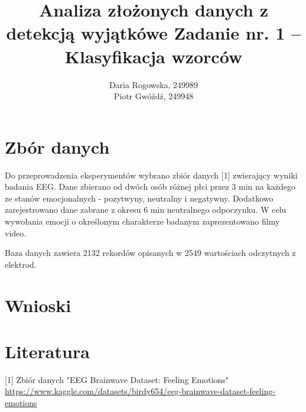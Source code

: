 \documentclass[12pt]{article}
\title{Analiza złożonych danych z detekcją wyjątkówe   \linebreak
Zadanie nr. 1 – Klasyfikacja wzorców
  }
\author{Daria Rogowska, 249989  \\ 
Piotr Gwóźdź, 249948 }
\begin{document}
\begin{titlingpage}
\maketitle
\end{titlingpage}
\graphicspath{ {./pictures/} }
\newpage

\section*{Zbór danych}

Do przeprowadzenia eksperymentów wybrano zbiór danych [1] zwierający wyniki badania EEG. Dane zbierano od dwóch osób
 różnej płci przez 3 min na każdego ze stanów emocjonalnych - pozytwyny, neutralny i negatywny. Dodatkowo zarejestrowano dane
 zabrane z okresu 6 min neutralnego odpoczynku. W celu wywołania emocji o określonym charakterze badanym zaprezentowano filmy video. 

Baza danych zawiera 2132 rekordów opisanych w 2549 wartościach odczytnych z elektrod. 





\section*{Wnioski}


\section*{Literatura}
[1] Zbiór danych "EEG Brainwave Dataset: Feeling Emotions" \url{https://www.kaggle.com/datasets/birdy654/eeg-brainwave-dataset-feeling-emotions}
\end{document}
